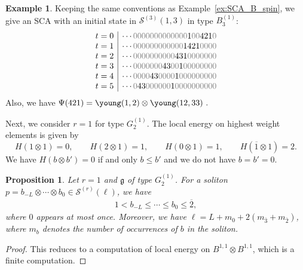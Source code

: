 \documentclass[reqno]{amsart}
\newcommand{\g}{\mathfrak{g}}
\newcommand{\Sol}{\mathcal{S}} %
\newcommand{\bon}{\overline{1}}
\newcommand{\btw}{\overline{2}}
\newcommand{\bth}{\overline{3}}
\theoremstyle{plain}
\newtheorem{prop}[thm]{Proposition}
\theoremstyle{definition}
\newtheorem{ex}[thm]{Example}
\numberwithin{equation}{section}
\begin{document}
\begin{ex}
\label{ex:SCA_B_spin2}
Keeping the same conventions as Example~\ref{ex:SCA_B_spin}, we give an SCA with an initial state in $\Sol^{(3)}(1,3)$ in type $B_3^{(1)}$:
\[
\begin{array}{c|c}
t = 0 & \cdots {\color{gray} 0000000000000} 1 {\color{gray} 00} 421 {\color{gray} 0} \\
t = 1 & \cdots {\color{gray} 000000000000} 1421 {\color{gray} 0000} \\
t = 2 & \cdots {\color{gray} 0000000000} 431 {\color{gray} 0000000} \\
t = 3 & \cdots {\color{gray} 0000000} 43 {\color{gray} 00} 1 {\color{gray} 00000000} \\
t = 4 & \cdots {\color{gray} 0000} 43 {\color{gray} 0000} 1 {\color{gray} 000000000} \\
t = 5 & \cdots {\color{gray} 0} 43 {\color{gray} 000000} 1 {\color{gray} 0000000000}
\end{array}
\]
Also, we have $\Psi(421) = \young(1,2) \otimes \young(12,33)\ .$
\end{ex}

Next, we consider $r = 1$ for type $G_2^{(1)}$.
The local energy on highest weight elements is given by
\[
H(1 \otimes 1) = 0,
\qquad
H(2 \otimes 1) = 1,
\qquad
H(0 \otimes 1) = 1,
\qquad
H(\bon \otimes 1) = 2.
\]
We have $H(b \otimes b') = 0$ if and only $b \leq b'$ and we do not have $b = b' = 0$.

\begin{prop}
\label{prop:soliton_G2}
Let $r = 1$ and $\g$ of type $G_2^{(1)}$.
For a soliton $p = b_{-L} \otimes \cdots \otimes b_0 \in \Sol^{(r)}(\ell)$, we have
\begin{align*}
1 < b_{-L} \leq \cdots \leq b_0 \leq \btw,
\end{align*}
where $0$ appears at most once.
Moreover, we have $\ell = L + m_0 + 2(m_{\bth} + m_{\btw})$, where $m_b$ denotes the number of occurrences of $b$ in the soliton.
\end{prop}

\begin{proof}
This reduces to a computation of local energy on $B^{1,1} \otimes B^{1,1}$, which is a finite computation.
\end{proof}
\end{document}
